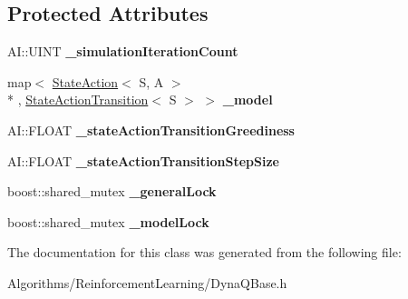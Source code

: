 \subsection*{Protected Attributes}
\begin{DoxyCompactItemize}
\item 
\hypertarget{classAI_1_1Algorithm_1_1DynaQBase_a3d375c3e01c7cc8a30c92109780adb9b}{A\-I\-::\-U\-I\-N\-T {\bfseries \-\_\-simulation\-Iteration\-Count}}\label{classAI_1_1Algorithm_1_1DynaQBase_a3d375c3e01c7cc8a30c92109780adb9b}

\item 
\hypertarget{classAI_1_1Algorithm_1_1DynaQBase_a1c9b96a2f0fa30d04d538b56ba008db4}{map$<$ \hyperlink{classAI_1_1StateAction}{State\-Action}$<$ S, A $>$\\*
, \hyperlink{classAI_1_1StateActionTransition}{State\-Action\-Transition}$<$ S $>$ $>$ {\bfseries \-\_\-model}}\label{classAI_1_1Algorithm_1_1DynaQBase_a1c9b96a2f0fa30d04d538b56ba008db4}

\item 
\hypertarget{classAI_1_1Algorithm_1_1DynaQBase_ae3f83dbeea191fc8bdcd518a2e54af97}{A\-I\-::\-F\-L\-O\-A\-T {\bfseries \-\_\-state\-Action\-Transition\-Greediness}}\label{classAI_1_1Algorithm_1_1DynaQBase_ae3f83dbeea191fc8bdcd518a2e54af97}

\item 
\hypertarget{classAI_1_1Algorithm_1_1DynaQBase_a1fd132ae0aeb356a891e5b81bf218338}{A\-I\-::\-F\-L\-O\-A\-T {\bfseries \-\_\-state\-Action\-Transition\-Step\-Size}}\label{classAI_1_1Algorithm_1_1DynaQBase_a1fd132ae0aeb356a891e5b81bf218338}

\item 
\hypertarget{classAI_1_1Algorithm_1_1DynaQBase_adc3615604882454399863291f73b8734}{boost\-::shared\-\_\-mutex {\bfseries \-\_\-general\-Lock}}\label{classAI_1_1Algorithm_1_1DynaQBase_adc3615604882454399863291f73b8734}

\item 
\hypertarget{classAI_1_1Algorithm_1_1DynaQBase_ab166bd02d02f17c76a7626372c649849}{boost\-::shared\-\_\-mutex {\bfseries \-\_\-model\-Lock}}\label{classAI_1_1Algorithm_1_1DynaQBase_ab166bd02d02f17c76a7626372c649849}

\end{DoxyCompactItemize}


The documentation for this class was generated from the following file\-:\begin{DoxyCompactItemize}
\item 
Algorithms/\-Reinforcement\-Learning/Dyna\-Q\-Base.\-h\end{DoxyCompactItemize}
